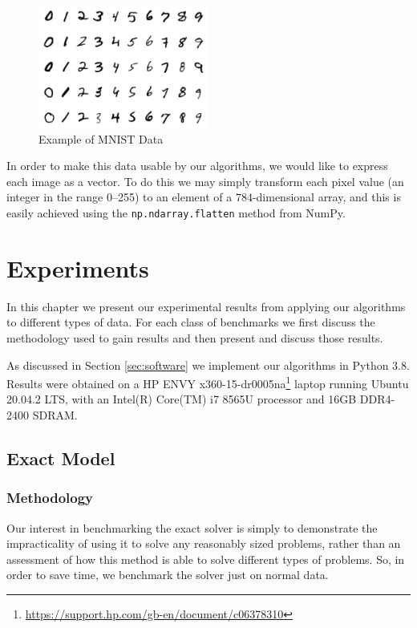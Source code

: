 \documentclass[11pt,twoside]{report}
\theoremstyle{definition}
\numberwithin{theorem}{section}
\numberwithin{definition}{section}
\numberwithin{lemma}{section}
\numberwithin{proposition}{section}
\numberwithin{equation}{section}
\numberwithin{figure}{section}
\begin{document}
\begin{figure}
    \centering
    \includegraphics[width=0.5\textwidth]{mnist_example.png}
    \caption{Example of MNIST Data}
    \label{fig:mnist_example}
\end{figure}

In order to make this data usable by our algorithms, we would like to express each image as a vector. To do this we may simply transform each pixel value (an integer in the range 0--255) to an element of a $784$-dimensional array, and this is easily achieved using the \texttt{np.ndarray.flatten} method from NumPy.

\chapter{Experiments}
In this chapter we present our experimental results from applying our algorithms to different types of data. For each class of benchmarks we first discuss the methodology used to gain results and then present and discuss those results.

As discussed in Section \ref{sec:software} we implement our algorithms in Python 3.8. Results were obtained on a HP ENVY x360-15-dr0005na\footnote{\url{https://support.hp.com/gb-en/document/c06378310}} laptop running Ubuntu 20.04.2 LTS, with an Intel(R) Core(TM) i7 8565U  processor and 16GB DDR4-2400 SDRAM.


\section{Exact Model}\label{exact benchmarks}
\subsection{Methodology}
Our interest in benchmarking the exact solver is simply to demonstrate the impracticality of using it to solve any reasonably sized problems, rather than an assessment of how this method is able to solve different types of problems. So, in order to save time, we benchmark the solver just on normal data.
\end{document}
